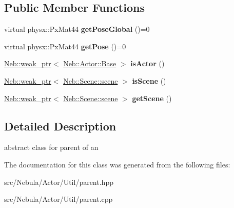 \subsection*{\-Public \-Member \-Functions}
\begin{DoxyCompactItemize}
\item 
\hypertarget{classNeb_1_1Actor_1_1parent_a621c0e5130e97130b638f81a3fd92395}{virtual physx\-::\-Px\-Mat44 {\bfseries get\-Pose\-Global} ()=0}\label{classNeb_1_1Actor_1_1parent_a621c0e5130e97130b638f81a3fd92395}

\item 
\hypertarget{classNeb_1_1Actor_1_1parent_acaa19d6eee398a5394113f8c70b187a3}{virtual physx\-::\-Px\-Mat44 {\bfseries get\-Pose} ()=0}\label{classNeb_1_1Actor_1_1parent_acaa19d6eee398a5394113f8c70b187a3}

\item 
\hypertarget{classNeb_1_1Actor_1_1parent_a7908936a1007b9b08c5fe7be82bc9b93}{\hyperlink{classNeb_1_1weak__ptr}{\-Neb\-::weak\-\_\-ptr}$<$ \hyperlink{classNeb_1_1Actor_1_1Base}{\-Neb\-::\-Actor\-::\-Base} $>$ {\bfseries is\-Actor} ()}\label{classNeb_1_1Actor_1_1parent_a7908936a1007b9b08c5fe7be82bc9b93}

\item 
\hypertarget{classNeb_1_1Actor_1_1parent_a5cf55c482acee3046f1e63ad0cac2126}{\hyperlink{classNeb_1_1weak__ptr}{\-Neb\-::weak\-\_\-ptr}$<$ \hyperlink{classNeb_1_1Scene_1_1scene}{\-Neb\-::\-Scene\-::scene} $>$ {\bfseries is\-Scene} ()}\label{classNeb_1_1Actor_1_1parent_a5cf55c482acee3046f1e63ad0cac2126}

\item 
\hypertarget{classNeb_1_1Actor_1_1parent_a27e149efe830d1f7afa7966a5e6a182a}{\hyperlink{classNeb_1_1weak__ptr}{\-Neb\-::weak\-\_\-ptr}$<$ \hyperlink{classNeb_1_1Scene_1_1scene}{\-Neb\-::\-Scene\-::scene} $>$ {\bfseries get\-Scene} ()}\label{classNeb_1_1Actor_1_1parent_a27e149efe830d1f7afa7966a5e6a182a}

\end{DoxyCompactItemize}


\subsection{\-Detailed \-Description}
abstract class for parent of an  

\-The documentation for this class was generated from the following files\-:\begin{DoxyCompactItemize}
\item 
src/\-Nebula/\-Actor/\-Util/parent.\-hpp\item 
src/\-Nebula/\-Actor/\-Util/parent.\-cpp\end{DoxyCompactItemize}
